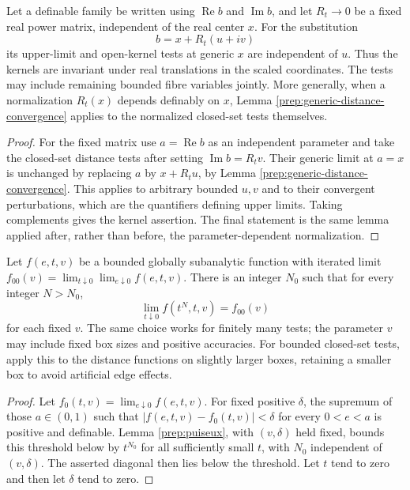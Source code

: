 \begin{corollary}\label{prep:generic-freezing}
Let a definable family be written using $\operatorname{Re}b$ and
$\operatorname{Im}b$, and let $R_t\to0$ be a fixed real power matrix,
independent of the real center $x$. For the substitution
\[
 b=x+R_t(u+iv)
\]
its upper-limit and open-kernel tests at generic $x$ are independent
of $u$. Thus the kernels are invariant under real translations in
the scaled coordinates. The tests may include remaining bounded
fibre variables jointly. More generally, when a normalization
$R_t(x)$ depends definably on $x$, Lemma
\ref{prep:generic-distance-convergence} applies to the normalized
closed-set tests themselves.
\end{corollary}

\begin{proof}
For the fixed matrix use $a=\operatorname{Re}b$ as an independent
parameter and take the closed-set distance tests after setting
$\operatorname{Im}b=R_tv$. Their generic limit at $a=x$ is unchanged
by replacing $a$ by $x+R_tu$, by Lemma
\ref{prep:generic-distance-convergence}. This applies to arbitrary
bounded $u,v$ and to their convergent perturbations, which are the
quantifiers defining upper limits. Taking complements gives the
kernel assertion. The final statement is the same lemma applied
after, rather than before, the parameter-dependent normalization.
\end{proof}

\begin{lemma}\label{prep:power-diagonalization}
Let $f(e,t,v)$ be a bounded globally subanalytic function with
iterated limit $f_{00}(v)=\lim_{t\downarrow0}\lim_{e\downarrow0}
f(e,t,v)$. There is an integer $N_0$ such that for every integer
$N>N_0$,
\[
 \lim_{t\downarrow0}f(t^N,t,v)=f_{00}(v)
\]
for each fixed $v$. The same choice works for finitely many tests;
the parameter $v$ may include fixed box sizes and positive
accuracies. For bounded closed-set tests, apply this to the distance
functions on slightly larger boxes, retaining a smaller box to
avoid artificial edge effects.
\end{lemma}

\begin{proof}
Let $f_0(t,v)=\lim_{e\downarrow0}f(e,t,v)$. For fixed positive
$\delta$, the supremum of those $a\in(0,1)$ such that
$|f(e,t,v)-f_0(t,v)|<\delta$ for every $0<e<a$ is positive and
definable. Lemma \ref{prep:puiseux}, with $(v,\delta)$ held fixed,
bounds this threshold below by $t^{N_0}$ for all sufficiently small
$t$, with $N_0$ independent of $(v,\delta)$. The asserted diagonal
then lies below the threshold. Let $t$ tend to zero and then let
$\delta$ tend to zero.
\end{proof}

